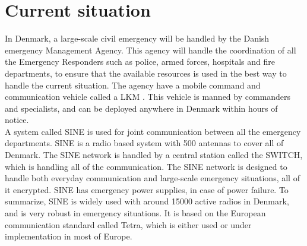 \section{Current situation}
In Denmark, a large-scale civil emergency will be handled by the Danish emergency Management Agency. This agency will handle the coordination of all the Emergency Responders such as police, armed forces, hospitals and fire departments, to ensure that the available resources is used in the best way to handle the current situation. The agency have a mobile command and communication vehicle called a LKM \cite{Beredskom}. This vehicle is manned by commanders and specialists, and can be deployed anywhere in Denmark within hours of notice. \\

A system called SINE \cite{SINE_artikel} is used for joint communication between all the emergency departments. SINE is a radio based system with 500 antennas to cover all of Denmark. The SINE network is handled by a central station called the SWITCH, which is handling all of the communication. The SINE network is designed to handle both everyday communication and large-scale emergency situations, all of it encrypted. SINE has emergency power supplies, in case of power failure. To summarize, SINE is widely used with around 15000 active radios in Denmark, and is very robust in emergency situations. It is based on the European communication standard called Tetra, which is either used or under implementation in most of Europe.